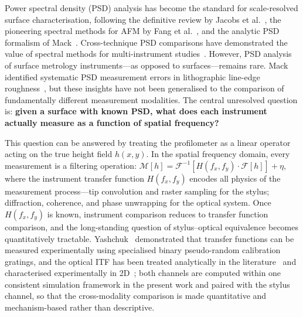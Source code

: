 \documentclass[review,12pt]{elsarticle}
\begin{document}
Power spectral density (PSD) analysis has become the standard for scale-resolved surface characterisation, following the definitive review by Jacobs et al.~\cite{jacobs2017quantitative}, the pioneering spectral methods for AFM by Fang et al.~\cite{fang1997analyzing}, and the analytic PSD formalism of Mack~\cite{mack2011analytic}. Cross-technique PSD comparisons have demonstrated the value of spectral methods for multi-instrument studies~\cite{marx2002power,yashchuk2005crosscheck}. However, PSD analysis of surface metrology instruments---as opposed to surfaces---remains rare. Mack identified systematic PSD measurement errors in lithographic line-edge roughness~\cite{mack2013systematic,mack2015more}, but these insights have not been generalised to the comparison of fundamentally different measurement modalities. The central unresolved question is: \textbf{given a surface with known PSD, what does each instrument actually measure as a function of spatial frequency?}

This question can be answered by treating the profilometer as a linear operator acting on the true height field $h(x,y)$. In the spatial frequency domain, every measurement is a filtering operation: $\mathcal{M}[h] = \mathcal{F}^{-1}[H(f_x,f_y) \cdot \mathcal{F}[h]] + \eta$, where the instrument transfer function $H(f_x,f_y)$ encodes all physics of the measurement process---tip convolution and raster sampling for the stylus; diffraction, coherence, and phase unwrapping for the optical system. Once $H(f_x,f_y)$ is known, instrument comparison reduces to transfer function comparison, and the long-standing question of stylus--optical equivalence becomes quantitatively tractable. Yashchuk~\cite{yashchuk2015binary} demonstrated that transfer functions can be measured experimentally using specialised binary pseudo-random calibration gratings, and the optical ITF has been treated analytically in the literature~\cite{degroot2021itf} and characterised experimentally in 2D~\cite{dai2020material,hirose2025topography}; both channels are computed within one consistent simulation framework in the present work and paired with the stylus channel, so that the cross-modality comparison is made quantitative and mechanism-based rather than descriptive.
\end{document}
